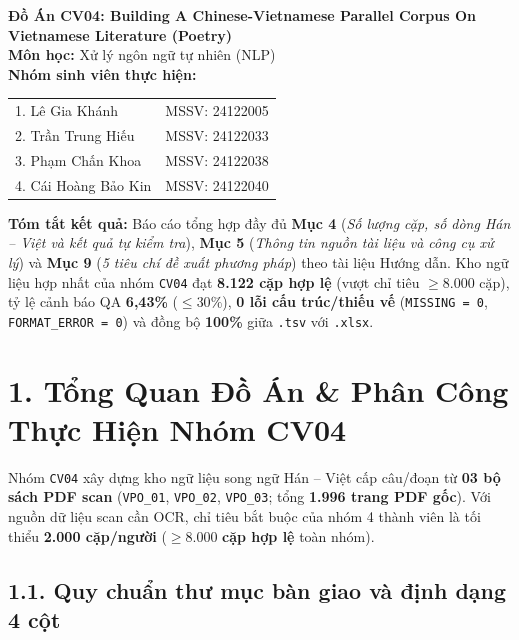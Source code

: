 \documentclass[11pt,a4paper]{article}
\begin{document}
\begin{center}
    {\Large \textbf{Đồ Án CV04: Building A Chinese-Vietnamese Parallel Corpus On Vietnamese Literature (Poetry)}}\\[0.3em]
    {\large \textbf{Môn học:} Xử lý ngôn ngữ tự nhiên (NLP)}\\[0.4em]
    \textbf{Nhóm sinh viên thực hiện:}\\[0.3em]
    \begin{tabular}{ll}
        1. Lê Gia Khánh & MSSV: 24122005 \\
        2. Trần Trung Hiếu & MSSV: 24122033 \\
        3. Phạm Chấn Khoa & MSSV: 24122038 \\
        4. Cái Hoàng Bảo Kin & MSSV: 24122040 \\
    \end{tabular}
\end{center}

\vspace{0.25em}
\noindent\textbf{Tóm tắt kết quả:}
Báo cáo tổng hợp đầy đủ \textbf{Mục 4} (\textit{Số lượng cặp, số dòng Hán -- Việt và kết quả tự kiểm tra}), \textbf{Mục 5} (\textit{Thông tin nguồn tài liệu và công cụ xử lý}) và \textbf{Mục 9} (\textit{5 tiêu chí đề xuất phương pháp}) theo tài liệu Hướng dẫn. Kho ngữ liệu hợp nhất của nhóm \texttt{CV04} đạt \textbf{8.122 cặp hợp lệ} (vượt chỉ tiêu $\ge 8.000$ cặp), tỷ lệ cảnh báo QA \textbf{6,43\%} ($\le 30\%$), \textbf{0 lỗi cấu trúc/thiếu vế} (\texttt{MISSING = 0}, \texttt{FORMAT\_ERROR = 0}) và đồng bộ \textbf{100\%} giữa \texttt{.tsv} với \texttt{.xlsx}.


\section{1. Tổng Quan Đồ Án \& Phân Công Thực Hiện Nhóm CV04}

Nhóm \texttt{CV04} xây dựng kho ngữ liệu song ngữ Hán -- Việt cấp câu/đoạn từ \textbf{03 bộ sách PDF scan} (\texttt{VPO\_01}, \texttt{VPO\_02}, \texttt{VPO\_03}; tổng \textbf{1.996 trang PDF gốc}). Với nguồn dữ liệu scan cần OCR, chỉ tiêu bắt buộc của nhóm 4 thành viên là tối thiểu \textbf{2.000 cặp/người} ($\ge \mathbf{8.000}$ \textbf{cặp hợp lệ} toàn nhóm).

\subsection{1.1. Quy chuẩn thư mục bàn giao và định dạng 4 cột}
\end{document}
